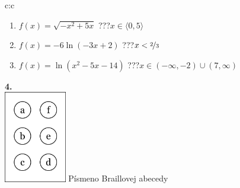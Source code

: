 \documentclass[10pt]{report}
\begin{document}
\begin{tabular}{c:c}
\begin{minipage}[c][104.5mm][t]{0.5\linewidth}
\begin{center}
\begin{minipage}{0.79\linewidth}
\begin{center}
\begin{varwidth}{\linewidth}
\begin{enumerate}
\item $f(x)=\sqrt{-x^2+5x}$\quad \dotfill\; ???\;\dotfill \quad $x\in\langle0 , 5\rangle$
\item $f(x)=-6\ln{(-3x+2)}$\quad \dotfill\; ???\;\dotfill \quad $x<\nicefrac{2}{3}$
\item $f(x)=\ln{(x^2-5x-14)}$\quad \dotfill\; ???\;\dotfill \quad $x\in(-\infty , -2)\cup(7 , \infty)$
\end{enumerate}
\end{varwidth}
\end{center}
\end{minipage}
\begin{minipage}{0.20\linewidth}
\begin{center}
{\Huge\bfseries 4.} \\[2mm]
\includegraphics[height=40mm]{../images/braille.png}
{\small Písmeno Braillovej abecedy}
\end{center}
\end{minipage}
\end{center}
\end{minipage}
%
\end{tabular}
\newpage
\thispagestyle{empty}
\end{document}
